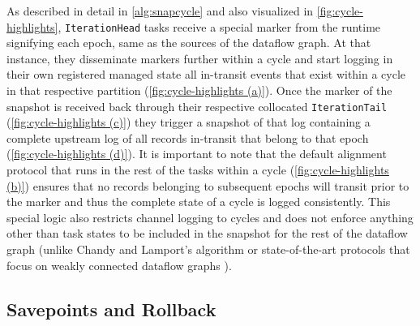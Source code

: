 As described in detail in \autoref{alg:snapcycle} and also visualized in \autoref{fig:cycle-highlights}, \texttt{IterationHead} tasks receive a special marker from the runtime signifying each epoch, same as the sources of the dataflow graph. At that instance, they disseminate markers further within a cycle and start logging in their own registered managed state all in-transit events that exist within a cycle in that respective partition (\autoref{fig:cycle-highlights (a)}). Once the marker of the snapshot is received back through their respective collocated \texttt{IterationTail} (\autoref{fig:cycle-highlights (c)}) they trigger a snapshot of that log containing a complete upstream log of all records in-transit that belong to that epoch (\autoref{fig:cycle-highlights (d)}). It is important to note that the default alignment protocol that runs in the rest of the tasks within a cycle (\autoref{fig:cycle-highlights (b)}) ensures that no records belonging to subsequent epochs will transit prior to the marker and thus the complete state of a cycle is logged consistently. This special logic also restricts channel logging to cycles and does not enforce anything other than task states to be included in the snapshot for the rest of the dataflow graph (unlike Chandy and Lamport's \cite{chandy1985distributed} algorithm or state-of-the-art protocols that focus on weakly connected dataflow graphs \cite{elnozahy2002survey,jacques2016consistent,murray2013naiad}).


\subsection{Savepoints and Rollback}





